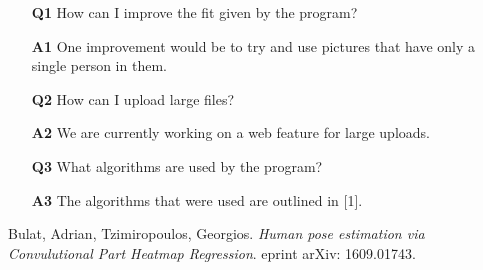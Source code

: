 \documentclass{scrreprt}
\begin{document}
\begin{enumerate}
        \item[\textbf{Q1}] How can I improve the fit given by the program?

        \item[\textbf{A1}] One improvement would be to try and use pictures that have only a single person in them.

        \item[\textbf{Q2}] How can I upload large files?

        \item[\textbf{A2}] We are currently working on a web feature for large uploads.

        \item[\textbf{Q3}] What algorithms are used by the program?

        \item[\textbf{A3}] The algorithms that were used are outlined in [1].
\end{enumerate}

\begin{thebibliography}{9}

Bulat, Adrian, Tzimiropoulos, Georgios.
\textit{Human pose estimation via Convulutional Part Heatmap Regression}.
eprint arXiv: 1609.01743.

\end{thebibliography}
\end{document}
